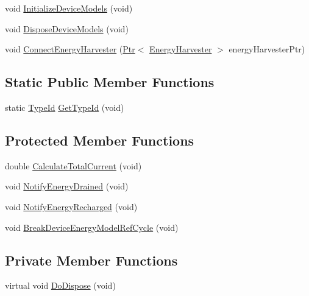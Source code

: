 \begin{DoxyCompactItemize}
\item 
void \hyperlink{classns3_1_1EnergySource_aac5fe233a38918d36150b0af007c7ea8}{Initialize\+Device\+Models} (void)
\item 
void \hyperlink{classns3_1_1EnergySource_a1da1997d065a1280fa71779ba930cce9}{Dispose\+Device\+Models} (void)
\item 
void \hyperlink{classns3_1_1EnergySource_a0b1d1080b0ab578cd2693e1029641d61}{Connect\+Energy\+Harvester} (\hyperlink{classns3_1_1Ptr}{Ptr}$<$ \hyperlink{classns3_1_1EnergyHarvester}{Energy\+Harvester} $>$ energy\+Harvester\+Ptr)
\end{DoxyCompactItemize}
\subsection*{Static Public Member Functions}
\begin{DoxyCompactItemize}
\item 
static \hyperlink{classns3_1_1TypeId}{Type\+Id} \hyperlink{classns3_1_1EnergySource_afa2c35556f37551e8674e63bb3b97d21}{Get\+Type\+Id} (void)
\end{DoxyCompactItemize}
\subsection*{Protected Member Functions}
\begin{DoxyCompactItemize}
\item 
double \hyperlink{classns3_1_1EnergySource_ac8b121ba1389d5545705e52d1a6fd602}{Calculate\+Total\+Current} (void)
\item 
void \hyperlink{classns3_1_1EnergySource_af93e047506b5bed57c14f10e28725e9f}{Notify\+Energy\+Drained} (void)
\item 
void \hyperlink{classns3_1_1EnergySource_a184eb82e77cfc3ab7f9a1a577f34575d}{Notify\+Energy\+Recharged} (void)
\item 
void \hyperlink{classns3_1_1EnergySource_a7a91665a6b2e6a01bf6b4a641b53bd45}{Break\+Device\+Energy\+Model\+Ref\+Cycle} (void)
\end{DoxyCompactItemize}
\subsection*{Private Member Functions}
\begin{DoxyCompactItemize}
\item 
virtual void \hyperlink{classns3_1_1EnergySource_adf10a9a0ac6bc62be24eea31a8c22a12}{Do\+Dispose} (void)
\end{DoxyCompactItemize}
